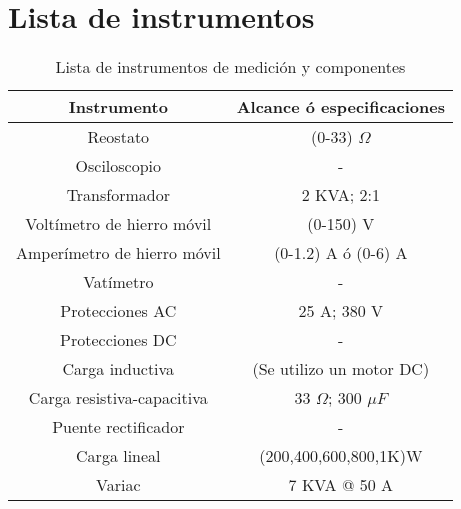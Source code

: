 \documentclass[11pt,letterpaper]{article}     %
\begin{document}
\section{Lista de instrumentos}
\begin{table}[H]
	\caption{Lista de instrumentos de medición y componentes}
	\centering
	\begin{tabular}{|c|c|}
		\hline 
		Instrumento & Alcance ó especificaciones \\ \hline 
		Reostato &  (0-33) $\Omega$ \\  
		\hline 
		Osciloscopio &  - \\ 
		\hline 
		Transformador &  2 KVA; 2:1 \\  
		\hline 
		Voltímetro de hierro móvil &  (0-150) V\\  
		\hline 
		Amperímetro de hierro móvil &(0-1.2) A ó (0-6) A \\ 
		\hline
		Vatímetro & -	\\
		\hline
		Protecciones AC & 25 A; 380 V\\ 
		\hline
		Protecciones DC & -\\ 
		\hline
		Carga inductiva& (Se utilizo un motor DC) \\ 
		\hline
		Carga resistiva-capacitiva& 33 $\Omega$; 300 $\mu F$ \\ 
		\hline
		Puente rectificador & -  \\
		\hline
		Carga lineal & (200,400,600,800,1K)W  \\
		\hline
		Variac & 7 KVA @ 50 A 
		\\
		\hline 
	\end{tabular} 
\end{table}
\end{document}
